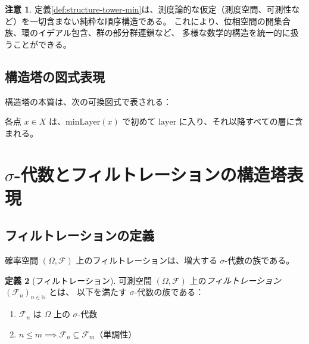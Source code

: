 \documentclass[11pt,a4paper,ja=standard]{ltjsarticle}
\theoremstyle{definition}
\newtheorem{definition}{定義}[section]
\newtheorem{remark}[definition]{注意}
\newcommand{\N}{\mathbb{N}}
\newcommand{\F}{\mathcal{F}}
\newcommand{\minLayer}{\mathrm{minLayer}}
\newcommand{\layer}{\mathrm{layer}}
\begin{document}
\begin{remark}
定義\ref{def:structure-tower-min}は、測度論的な仮定（測度空間、可測性など）を一切含まない純粋な順序構造である。
これにより、位相空間の開集合族、環のイデアル包含、群の部分群連鎖など、
多様な数学的構造を統一的に扱うことができる。
\end{remark}

\subsection{構造塔の図式表現}

構造塔の本質は、次の可換図式で表される：

\begin{center}
\end{center}

各点 $x \in X$ は、$\minLayer(x)$ で初めて $\layer$ に入り、それ以降すべての層に含まれる。

\section{$\sigma$-代数とフィルトレーションの構造塔表現}

\subsection{フィルトレーションの定義}

確率空間 $(\Omega, \F)$ 上のフィルトレーションは、増大する $\sigma$-代数の族である。

\begin{definition}[フィルトレーション]\label{def:filtration}
可測空間 $(\Omega, \F)$ 上の\emph{フィルトレーション} $(\F_n)_{n \in \N}$ とは、
以下を満たす $\sigma$-代数の族である：
\begin{enumerate}[label=(\roman*)]
\item $\F_n$ は $\Omega$ 上の $\sigma$-代数
\item $n \le m \implies \F_n \subseteq \F_m$（単調性）
\end{enumerate}
\end{definition}
\end{document}

